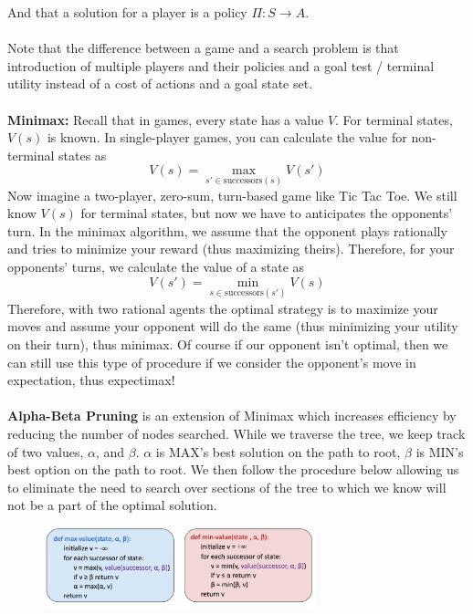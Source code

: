 \documentclass[a4paper]{article}
\begin{document}
\noindent And that a solution for a player is a policy $\Pi: S \rightarrow A$.
\\ \\
\noindent Note that the difference between a game and a search problem is that introduction of multiple players and their policies and a goal test / terminal utility instead of a cost of actions and a goal state set.
\\ \\ 
\textbf{Minimax:} Recall that in games, every state has a value $V$. For terminal states, $V(s)$ is known. In single-player games, you can calculate the value for non-terminal states as 
$$V(s) = \underset{s' \in \textrm{successors}(s)}{\operatorname{max}} V(s')$$
Now imagine a two-player, zero-sum, turn-based game like Tic Tac Toe. We still know $V(s)$ for terminal states, but now we have to anticipates the opponents' turn. In the minimax algorithm, we assume that the opponent plays rationally and tries to minimize your reward (thus maximizing theirs). Therefore, for your opponents' turns, we calculate the value of a state as 
$$V(s') = \underset{s \in \textrm{successors}(s')}{\operatorname{min}} V(s)$$
Therefore, with two rational agents the optimal strategy is to maximize your moves and assume your opponent will do the same (thus minimizing your utility on their turn), thus minimax. Of course if our opponent isn't optimal, then we can still use this type of procedure if we consider the opponent's move in expectation, thus expectimax!
\\ \\
\textbf{Alpha-Beta Pruning} is an extension of Minimax which increases efficiency by reducing the number of nodes searched. While we traverse the tree, we keep track of two values, $\alpha$, and $\beta$. $\alpha$ is MAX's best solution on the path to root, $\beta$ is MIN's best option on the path to root. We then follow the procedure below allowing us to eliminate the need to search over sections of the tree to which we know will not be a part of the optimal solution.
\begin{figure}[ht]
\centering
\includegraphics[width=0.7\textwidth]{figs/abalg}
\end{figure}
\end{document}

